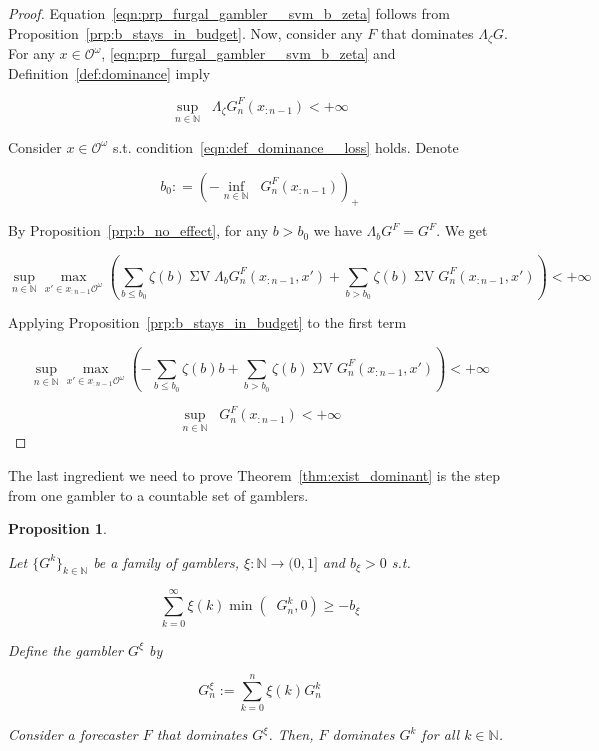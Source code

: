 \documentclass[11pt]{article}
\theoremstyle{definition}
\theoremstyle{plain}
\newtheorem{proposition}{Proposition}%
\newcommand{\Nats}{\mathbb{N}}
\newcommand{\Sq}[2]{\{#1\}_{#2 \in \Nats}}
\newcommand{\Ob}{\mathcal{O}}
\newcommand{\OO}{\Ob^\omega}
\DeclareMathOperator{\SV}{\Sigma V}
\DeclareMathOperator{\SVM}{\Sigma V_{\min}}
\DeclareMathOperator{\SVX}{\Sigma V_{\max}}
\newcommand{\Bd}{\Lambda}
\begin{document}
\begin{proof}

Equation~\ref{eqn:prp_furgal_gambler__svm_b_zeta} follows from Proposition~\ref{prp:b_stays_in_budget}. Now, consider any $F$ that dominates $\Bd_\zeta G$. For any $x \in \OO$, \ref{eqn:prp_furgal_gambler__svm_b_zeta} and Definition~\ref{def:dominance} imply

\[\sup_{n \in \Nats} {\SVX \Bd_\zeta G^F_{n}\left(x_{:n-1}\right)} < +\infty\]

Consider $x \in \OO$ s.t. condition~\ref{eqn:def_dominance__loss} holds. Denote

\[b_0: = \left( -\inf_{n \in \Nats} {\SVM G^F_{n}\left(x_{:n-1}\right)}\right)_+\]

By Proposition~\ref{prp:b_no_effect}, for any $b > b_0$ we have $\Bd_b G^F = G^F$. We get

\[\sup_{n \in \Nats} \max_{x' \in x_{:n-1}\OO} \left(\sum_{b \leq b_0} \zeta\left(b\right) {\SV \Bd_b G^F_{n}\left(x_{:n-1},x'\right)} + \sum_{b > b_0} \zeta\left(b\right) \SV G^F_{n}\left(x_{:n-1},x'\right)\right) < +\infty\]

Applying Proposition~\ref{prp:b_stays_in_budget} to the first term

\[\sup_{n \in \Nats} \max_{x' \in x_{:n-1}\OO} \left(-\sum_{b \leq b_0} \zeta\left(b\right) b + \sum_{b > b_0} \zeta\left(b\right) \SV G^F_{n}\left(x_{:n-1},x'\right)\right) < +\infty\]

\[\sup_{n \in \Nats} \SVX G^F_{n}\left(x_{:n-1}\right) < +\infty\]
\end{proof}

The last ingredient we need to prove Theorem~\ref{thm:exist_dominant} is the step from one gambler to a countable set of gamblers.

\begin{proposition}
\label{prp:combining_gamblers}

Let $\Sq{G^k}{k}$ be a family of gamblers, $\xi: \Nats \rightarrow (0,1]$ and $b_\xi > 0$ s.t.

\begin{equation}
\label{eqn:prp_combining_gamblers__budget}
\sum_{k = 0}^\infty \xi\left(k\right) \min\left(\SVM G^k_n,0\right) \geq -b_\xi
\end{equation}

Define the gambler $G^\xi$ by

\begin{equation}
G^\xi_n := \sum_{k = 0}^n \xi\left(k\right) G^k_n
\end{equation}

Consider a forecaster $F$ that dominates $G^\xi$. Then, $F$ dominates $G^k$ for all $k \in \Nats$.

\end{proposition}
\end{document}
